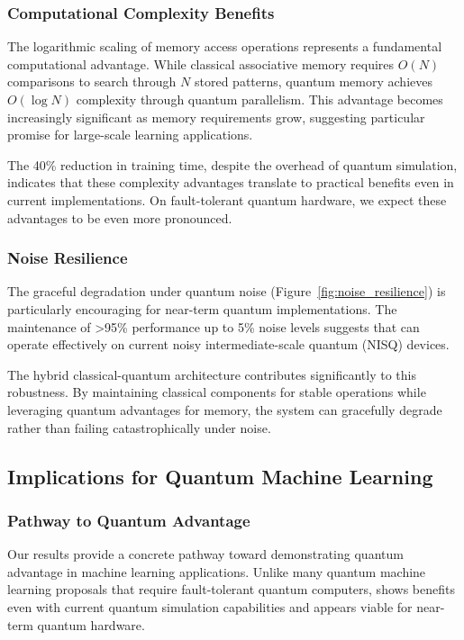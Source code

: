 \subsubsection{Computational Complexity Benefits}

The logarithmic scaling of memory access operations represents a fundamental computational advantage. While classical associative memory requires $O(N)$ comparisons to search through $N$ stored patterns, quantum memory achieves $O(\log N)$ complexity through quantum parallelism. This advantage becomes increasingly significant as memory requirements grow, suggesting particular promise for large-scale learning applications.

The 40\% reduction in training time, despite the overhead of quantum simulation, indicates that these complexity advantages translate to practical benefits even in current implementations. On fault-tolerant quantum hardware, we expect these advantages to be even more pronounced.

\subsubsection{Noise Resilience}

The graceful degradation under quantum noise (Figure~\ref{fig:noise_resilience}) is particularly encouraging for near-term quantum implementations. The maintenance of >95\% performance up to 5\% noise levels suggests that \qmnn can operate effectively on current noisy intermediate-scale quantum (NISQ) devices.

The hybrid classical-quantum architecture contributes significantly to this robustness. By maintaining classical components for stable operations while leveraging quantum advantages for memory, the system can gracefully degrade rather than failing catastrophically under noise.

\subsection{Implications for Quantum Machine Learning}

\subsubsection{Pathway to Quantum Advantage}

Our results provide a concrete pathway toward demonstrating quantum advantage in machine learning applications. Unlike many quantum machine learning proposals that require fault-tolerant quantum computers, \qmnn shows benefits even with current quantum simulation capabilities and appears viable for near-term quantum hardware.


